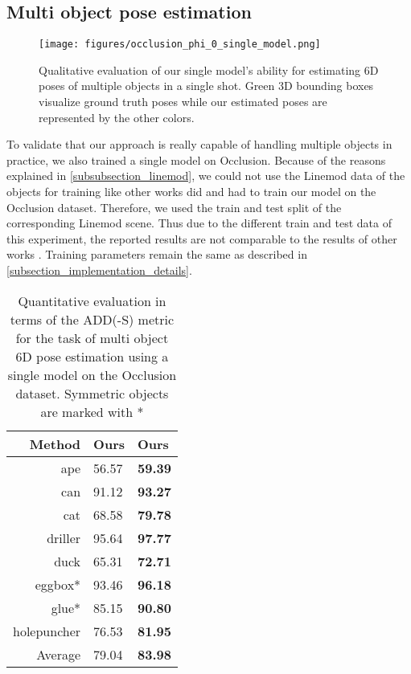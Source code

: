 \documentclass[twocolumn, 10pt, letterpaper]{article}
\begin{document}
\subsection{Multi object pose estimation}
\label{subsection_occlusion_single_model}

\begin{figure}
\texttt{[image: figures/occlusion\_phi\_0\_single\_model.png]}
\caption{Qualitative evaluation of our single  model's ability for estimating 6D poses of multiple objects in a single shot. Green 3D bounding boxes visualize ground truth poses while our estimated poses are represented by the other colors.}
\label{figure_merged_occlusion_phi_0_example}
\end{figure}

To validate that our approach is really capable of handling multiple objects in practice, we also trained a single model on Occlusion. Because of the reasons explained in \autoref{subsubsection_linemod}, we could not use the Linemod data of the objects for training like other works did \cite{PVNet}\cite{PoseCNN} and had to train our model on the Occlusion dataset. Therefore, we used the train and test split of the corresponding Linemod scene. Thus due to the different train and test data of this experiment, the reported results are not comparable to the results of other works \cite{PVNet}\cite{PoseCNN}. Training parameters remain the same as described in \autoref{subsection_implementation_details}.
\begin{table}
\begin{tabularx}{\columnwidth}{ | r | X  X |}
 \hline
 Method & \textbf{Ours}  & \textbf{Ours}   \\
 \hline
 ape            & 56.57 & \textbf{59.39} \\
 can            & 91.12 & \textbf{93.27} \\
 cat            & 68.58 & \textbf{79.78} \\
 driller        & 95.64 & \textbf{97.77} \\
 duck           & 65.31 & \textbf{72.71} \\
 eggbox*        & 93.46 & \textbf{96.18} \\
 glue*          & 85.15 & \textbf{90.80} \\
 holepuncher    & 76.53 & \textbf{81.95} \\
 \hline
 Average & 79.04 & \textbf{83.98} \\
 \hline
\end{tabularx}
\caption{Quantitative evaluation in terms of the ADD(-S) metric for the task of multi object 6D pose estimation using a single model on the Occlusion dataset. Symmetric objects are marked with *}
\label{table_occlusion_single_model_results}
\end{table}
\end{document}
